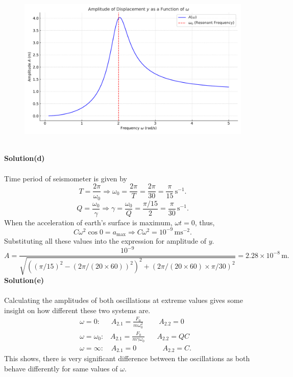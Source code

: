 \documentclass[12pt,a4paper]{article}
\begin{document}
\begin{figure}[h]
    \centering
    \includegraphics[width=1\linewidth]{figs/fig_sol_2.2c.pdf}
\end{figure}
\\\textbf{Solution(d)}
\\
\\Time period of seismometer is given by
\[T=\frac{2\pi}{\omega_0}\Rightarrow \omega_0=\frac{2\pi}{T}=\frac{2\pi}{30}=\frac{\pi}{15}\,\text{s}^{-1}.\]
\[Q=\frac{\omega_0}{\gamma}\Rightarrow\gamma=\frac{\omega_0}{Q}=\frac{\pi/15}{2}=\frac{\pi}{30}\,\text{s}^{-1}.\]
When the acceleration of earth's surface is maximum, $\omega t=0$, thus,
\[C\omega^2\cos0=a_{\text{max}}\Rightarrow C\omega^2=10^{-9}\,\text{ms}^{-2}.\]
Substituting all these values into the expression for amplitude of $y$.
\[A=\frac{10^{-9}}{\sqrt{((\pi/15)^2-(2\pi/(20\times60))^2)^2+(2\pi/(20\times60)\times\pi/30)^2}}=2.28\times10^{-8}\,\text{m}.\]
\textbf{Solution(e)}
\\
\\Calculating the amplitudes of both oscillations at extreme values gives some insight on how different these two systems are.
\begin{align*}
    &\omega=0:\,\,\,\,\,\,\,\,\,A_{2.1}=\frac{F_0}{m\omega_0^2}\,\,\,\,\,\,\,\,\,\,\,\,\,A_{2.2}=0
\\&\omega=\omega_0:\,\,\,\,\,A_{2.1}=\frac{F_0}{m\gamma\omega_0}\,\,\,\,\,\,\,\,\,\,A_{2.2}=QC
\\&\omega=\infty:\,\,\,\,\,\,A_{2.1}=0\,\,\,\,\,\,\,\,\,\,\,\,\,\,\,\,\,\,\,\,\,\,A_{2.2}=C.
\end{align*}
This shows, there is very significant difference between the oscillations as both behave differently for same values of $\omega$.
\end{document}
